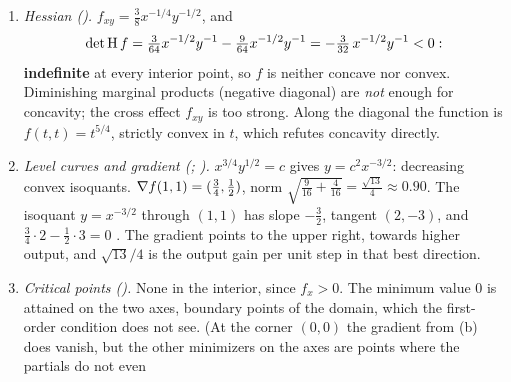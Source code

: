 \begin{solutions}
\begin{enumerate}[label=(\alph*),leftmargin=1.8em,itemsep=0.4ex]
                factor $x^{-1/4}$ is infinite, and likewise $y^{-1/2}$ on the
                axis $y=0$ (with $x>0$): the partials do not exist there.
                The origin is the exception: $f$ vanishes on both axes, so
                $f_{x}(0,0)=f_{y}(0,0)=0$, and
                $0\le f(h,k)\le\lVert(h,k)\rVert^{5/4}$ shows that $f$ is
                differentiable there (from inside the quadrant) with zero
                derivative. Second partials:
                $f_{xx}=-\tfrac{3}{16}x^{-5/4}y^{1/2}<0$,
                $f_{yy}=-\tfrac14x^{3/4}y^{-3/2}<0$: both marginal products
                \textbf{diminish}.
          \item \emph{Hessian ().}
                $f_{xy}=\tfrac38x^{-1/4}y^{-1/2}$, and
                \[
                  \det\operatorname{H} f=\tfrac{3}{64}x^{-1/2}y^{-1}
                  -\tfrac{9}{64}x^{-1/2}y^{-1}
                  =-\tfrac{3}{32}\,x^{-1/2}y^{-1}<0 :
                \]
                \textbf{indefinite} at every interior point, so $f$ is
                neither concave nor convex. Diminishing marginal products
                (negative diagonal) are \emph{not} enough for concavity;
                the cross effect $f_{xy}$ is too strong. Along the diagonal
                the function is $f(t,t)=t^{5/4}$, strictly convex in $t$,
                which refutes concavity directly.
          \item \emph{Level curves and gradient (; ).}
                $x^{3/4}y^{1/2}=c$ gives $y=c^{2}x^{-3/2}$: decreasing convex
                isoquants. $\nabla f(1,1)=(\tfrac34,\tfrac12)$, norm
                $\sqrt{\tfrac{9}{16}+\tfrac{4}{16}}=\tfrac{\sqrt{13}}{4}
                \approx0.90$. The isoquant $y=x^{-3/2}$ through $(1,1)$ has
                slope $-\tfrac32$, tangent $(2,-3)$, and
                $\tfrac34\cdot2-\tfrac12\cdot3=0$ \checkmark. The gradient
                points to the upper right, towards higher output, and
                $\sqrt{13}/4$ is the output gain per unit step in that best
                direction.
          \item \emph{Critical points ().} None in the
                interior, since $f_{x}>0$. The minimum value $0$ is attained
                on the two axes, boundary points of the domain, which the
                first-order condition does not see. (At the corner $(0,0)$
                the gradient from (b) does vanish, but the other minimizers
                on the axes are points where the partials do not even

\end{enumerate}
\end{solutions}
